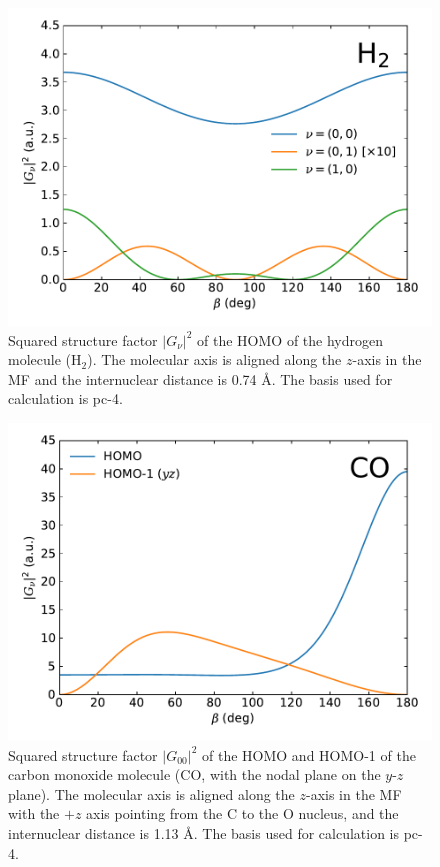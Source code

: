 \documentclass[preprint,12pt]{elsarticle} %
\renewcommand{\rm}[1]{\mathrm{#1}}    %
\newcommand{\abs}[1]{\lvert #1 \rvert}  %
\begin{document}
\begin{figure}
    \centering
    \includegraphics[width=\columnwidth]{H2_Example_sub_20230225.pdf}
    \caption{Squared structure factor $\abs{G_\nu}^2$ of the HOMO of the hydrogen molecule ($\rm{H}_2$). The molecular axis is aligned along the $z$-axis in the MF and the internuclear distance is 0.74 \r{A}. The basis used for calculation is pc-4.}
    \label{fig:example_H2}
\end{figure}

\begin{figure}
    \centering
    \includegraphics[width=\columnwidth]{CO_Example_sub_20230225.pdf}
    \caption{Squared structure factor $\abs{G_{00}}^2$ of the HOMO and HOMO-1 of the carbon monoxide molecule ($\rm{CO}$, with the nodal plane on the $y$-$z$ plane). The molecular axis is aligned along the $z$-axis in the MF with the $+z$ axis pointing from the C to the O nucleus, and the internuclear distance is 1.13 \r{A}. The basis used for calculation is pc-4.}
    \label{fig:example_CO}
\end{figure}
\end{document}
